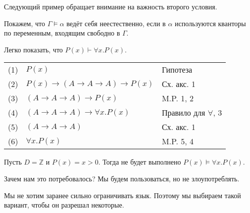 Следующий пример обращает внимание на важность второго условия.
\begin{example}
    Покажем, что $\Gamma\models\alpha$ ведёт себя неестественно, если
в $\alpha$ используются кванторы по переменным, входящим свободно в $\Gamma$.

Легко показать, что $P(x)\vdash \forall x.P(x)$.

\begin{tabular}{lll}
(1) & $P(x)$ & Гипотеза \\
(2) & $P(x)\rightarrow (A\rightarrow A \rightarrow A) \rightarrow P(x)$ & Сх. акс. 1\\
(3) & $(A\rightarrow A \rightarrow A) \rightarrow P(x)$ & M.P. 1, 2\\
(4) & $(A\rightarrow A \rightarrow A) \rightarrow \forall x.P(x)$ & Правило для $\forall$, 3\\
(5) & $(A\rightarrow A \rightarrow A)$ & Сх. акс. 1\\
(6) & $\forall x.P(x)$ & M.P. 5, 4
\end{tabular}

Пусть $D = \mathbb{Z}$ и $P(x) = x > 0$. Тогда не будет выполнено $P(x)\models \forall x.P(x)$.
\end{example}

Зачем нам это потребовалось?  Мы будем пользоваться, но не злоупотреблять.

Мы не хотим заранее сильно ограничивать язык. Поэтому мы выбираем такой вариант, чтобы он разрешал некоторые.

